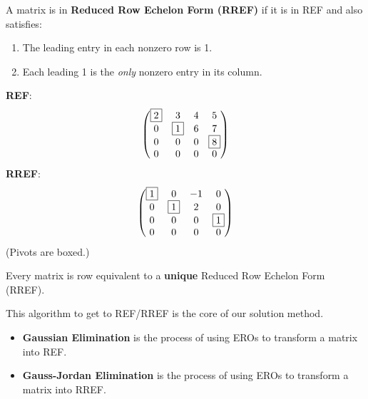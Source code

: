 \documentclass[oneside]{book}
\begin{document}
\begin{definition}
A matrix is in \textbf{Reduced Row Echelon Form (RREF)} if it is in REF and also satisfies:
\begin{enumerate}
    \item The leading entry in each nonzero row is 1.
    \item Each leading 1 is the \emph{only} nonzero entry in its column.
\end{enumerate}
\end{definition}



\begin{example}
\textbf{REF}:
\[ \begin{pmatrix} \fbox{2} & 3 & 4 & 5 \\ 0 & \fbox{1} & 6 & 7 \\ 0 & 0 & 0 & \fbox{8} \\ 0 & 0 & 0 & 0 \end{pmatrix} \]
\textbf{RREF}:
\[ \begin{pmatrix} \fbox{1} & 0 & -1 & 0 \\ 0 & \fbox{1} & 2 & 0 \\ 0 & 0 & 0 & \fbox{1} \\ 0 & 0 & 0 & 0 \end{pmatrix} \]
(Pivots are boxed.)
\end{example}

\begin{theorem}
Every matrix is row equivalent to a \textbf{unique} Reduced Row Echelon Form (RREF).
\end{theorem}

This algorithm to get to REF/RREF is the core of our solution method.

\begin{definition}
\begin{itemize}
    \item \textbf{Gaussian Elimination} is the process of using EROs to transform a matrix into REF.
    \item \textbf{Gauss-Jordan Elimination} is the process of using EROs to transform a matrix into RREF.
\end{itemize}
\end{definition}
\end{document}
